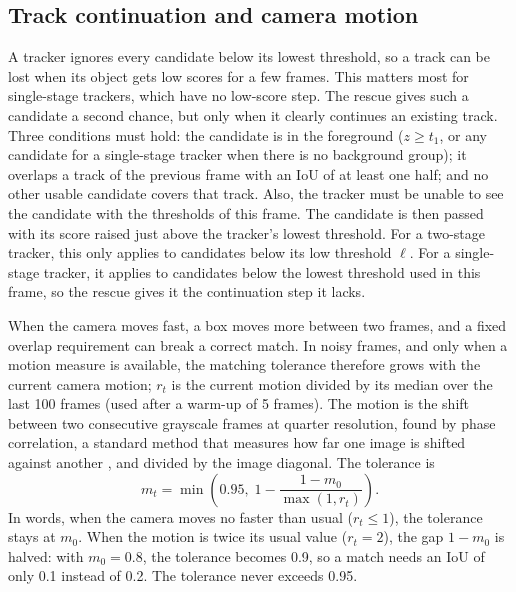 \subsection{Track continuation and camera motion}\label{sec:rescue}
A tracker ignores every candidate below its lowest threshold, so a track can
be lost when its object gets low scores for a few frames. This matters most
for single-stage trackers, which have no low-score step. The rescue gives
such a candidate a second chance, but only when it clearly continues an
existing track. Three conditions must hold: the candidate is in the
foreground ($z\ge t_1$, or any candidate for a single-stage tracker when
there is no background group); it overlaps a track of the previous frame
with an IoU of at least one half; and no other usable candidate covers that
track. Also, the tracker must be unable to see the candidate with the
thresholds of this frame. The candidate is then passed with its score raised
just above the tracker's lowest threshold. For a two-stage tracker, this only
applies to candidates below its low threshold $\ell$. For a single-stage
tracker, it applies to candidates below the lowest threshold used in this
frame, so the rescue gives it the continuation step it lacks.

When the camera moves fast, a box moves more between two frames, and a fixed
overlap requirement can break a correct match. In noisy frames, and only when
a motion measure is available, the matching tolerance therefore grows with
the current camera motion; $r_t$ is the current motion divided by its median
over the last 100 frames (used after a warm-up of 5 frames). The motion is the shift between two consecutive grayscale
frames at quarter resolution, found by phase correlation, a standard method
that measures how far one image is shifted against another
\cite{reddy1996phasecorr}, and divided by the image diagonal. The tolerance is
\begin{equation}
m_t=\min\!\left(0.95,\;1-\frac{1-m_0}{\max(1,r_t)}\right).
\label{eq:motion}
\end{equation}
In words, when the camera moves no faster than usual ($r_t\le1$), the
tolerance stays at $m_0$. When the motion is twice its usual value
($r_t=2$), the gap $1-m_0$ is halved: with $m_0=0.8$, the tolerance becomes
0.9, so a match needs an IoU of only 0.1 instead of 0.2. The tolerance never
exceeds 0.95.

